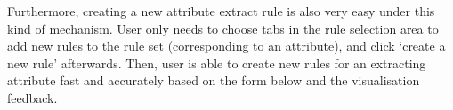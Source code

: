 \begin{table}[htbp!]
\small
\centering
\caption{Glyph Visualisation Elements}
\label{tab:glyph}
\end{table}

Furthermore, creating a new attribute extract rule is also very easy under this kind of mechanism. User only needs to choose tabs in the rule selection area to add new rules to the rule set (corresponding to an attribute), and click `create a new rule' afterwards. Then, user is able to create new rules for an extracting attribute fast and accurately based on the form below and the visualisation feedback.\\

